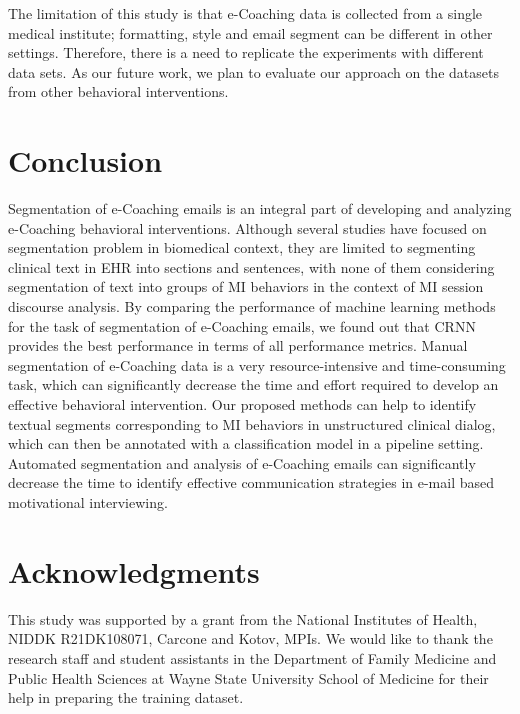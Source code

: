 \documentclass{amia}
\begin{document}
The limitation of this study is that e-Coaching data is collected from a single medical institute; formatting, style and email segment can be different in other settings. Therefore, there is a need to replicate the experiments with different data sets. As our future work, we plan to evaluate our approach on the datasets from other behavioral interventions. 
 
\section*{Conclusion}
Segmentation of e-Coaching emails is an integral part of developing and analyzing e-Coaching behavioral interventions. Although several studies have focused on segmentation problem in biomedical context, they are limited to segmenting clinical text in EHR into sections and sentences, with none of them considering segmentation of text into groups of MI behaviors in the context of MI session discourse analysis. By comparing the performance of machine learning methods for the task of segmentation of e-Coaching emails, we found out that CRNN provides the best performance in terms of all performance metrics. Manual segmentation of e-Coaching data is a very resource-intensive and time-consuming task, which can significantly decrease the time and effort required to develop an effective behavioral intervention. Our proposed methods can help to identify textual segments corresponding to MI behaviors in unstructured clinical dialog, which can then be annotated with a classification model in a pipeline setting. Automated segmentation and analysis of e-Coaching emails can significantly decrease the time to identify effective communication strategies in e-mail based motivational interviewing.

\section*{Acknowledgments}
This study was supported by a grant from the National Institutes of Health, NIDDK R21DK108071, Carcone and Kotov, MPIs. We would like to thank the research staff and student assistants in the Department of Family Medicine and Public Health Sciences at Wayne State University School of Medicine for their help in preparing the training dataset. 



\end{document}

